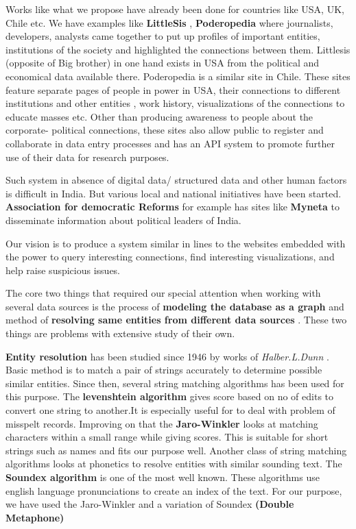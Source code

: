 Works like what we propose have already been done for countries like USA, UK, Chile etc. We have examples like \textbf{LittleSis} \cite{LilSis}, \textbf{Poderopedia} \cite{PODERO} where journalists, developers, analysts came together to put up profiles of important entities, institutions of the society and highlighted the connections between them. Littlesis (opposite of Big brother) in one hand exists in USA from the political and economical data available there. Poderopedia is a similar site in Chile. These sites feature separate pages of people in power in USA, their connections to different institutions and other entities , work history, visualizations of the connections to educate masses etc. Other than producing awareness to people about the corporate- political connections, these sites also allow public to register and collaborate in data entry processes and has an API system to promote further use of their data for research purposes.

Such system in absence of digital data/ structured data and other human factors is difficult in India. But various local and national initiatives have been started. \textbf{Association for democratic Reforms} \cite{ADR} for example has sites like \textbf{Myneta} \cite{MyNeta} to disseminate information about political leaders of India.	

Our vision is to produce a system similar in lines to the websites embedded with the power to query interesting connections, find interesting visualizations, and help raise suspicious issues.

The core two things that required our special attention when working with several data sources is the process of \textbf{ modeling the database as a graph } and method of \textbf{ resolving same entities from different data sources }. These two things are problems with extensive study of their own.

\textbf{ Entity resolution } has been studied since 1946 by works of \emph{ Halber.L.Dunn }\cite{dunn}. Basic method is to match a pair of strings accurately to determine possible similar entities. Since then, several string matching algorithms has been used for this purpose. The \textbf{ levenshtein algorithm } \cite{levenshtein} gives score based on no of edits to convert one string to another.It is especially useful for to deal with problem of misspelt records. Improving on that the \textbf{ Jaro-Winkler} \cite{jwinkler} looks at matching characters within a small range while giving scores. This is suitable for short strings such as names and fits our purpose well. Another class of string matching algorithms looks at phonetics to resolve entities with similar sounding text. The \textbf{ Soundex algorithm }\cite{knuth} is one of the most well known. These algorithms use english language pronunciations to create an index of the text. For our purpose, we have used the Jaro-Winkler and a variation of Soundex \textbf{ (Double Metaphone) }\cite{philips}

